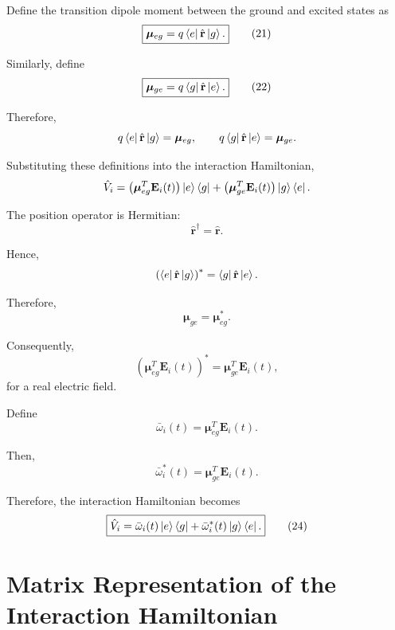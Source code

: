 \documentclass[12pt,a4paper]{article}
\newcommand{\ketg}{\left|g\right\rangle}
\newcommand{\kete}{\left|e\right\rangle}
\begin{document}
Define the transition dipole moment between the ground and excited
states as
\begin{equation}
\boxed{
\boldsymbol{\mu}_{eg}
=
q\bra e\hat{\mathbf r}\ketg.
}
\tag{21}
\end{equation}

Similarly, define
\begin{equation}
\boxed{
\boldsymbol{\mu}_{ge}
=
q\bra g\hat{\mathbf r}\kete.
}
\tag{22}
\end{equation}

Therefore,
\[
q
\bra e\hat{\mathbf r}\ketg
=
\boldsymbol{\mu}_{eg},
\qquad
q
\bra g\hat{\mathbf r}\kete
=
\boldsymbol{\mu}_{ge}.
\]

Substituting these definitions into the interaction Hamiltonian,
\[
\hat V_i
=
\left(
\boldsymbol{\mu}_{eg}^{T}
\mathbf E_i(t)
\right)
\kete\bra g
+
\left(
\boldsymbol{\mu}_{ge}^{T}
\mathbf E_i(t)
\right)
\ketg\bra e.
\]

The position operator is Hermitian:
\[
\hat{\mathbf r}^{\dagger}
=
\hat{\mathbf r}.
\]

Hence,
\[
\left(
\bra e\hat{\mathbf r}\ketg
\right)^{*}
=
\bra g\hat{\mathbf r}\kete.
\]

Therefore,
\[
\boldsymbol{\mu}_{ge}
=
\boldsymbol{\mu}_{eg}^{*}.
\]

Consequently,
\[
\left(
\boldsymbol{\mu}_{eg}^{T}\mathbf E_i(t)
\right)^{*}
=
\boldsymbol{\mu}_{ge}^{T}\mathbf E_i(t),
\]
for a real electric field.

Define
\begin{equation}
\boxed{
\bar{\omega}_i(t)
=
\boldsymbol{\mu}_{eg}^{T}\mathbf E_i(t).
}
\tag{23}
\end{equation}

Then,
\[
\bar{\omega}_i^{*}(t)
=
\boldsymbol{\mu}_{ge}^{T}\mathbf E_i(t).
\]

Therefore, the interaction Hamiltonian becomes
\begin{equation}
\boxed{
\hat V_i
=
\bar{\omega}_i(t)
\kete\bra g
+
\bar{\omega}_i^{*}(t)
\ketg\bra e.
}
\tag{24}
\end{equation}

\section{Matrix Representation of the Interaction Hamiltonian}
\end{document}
